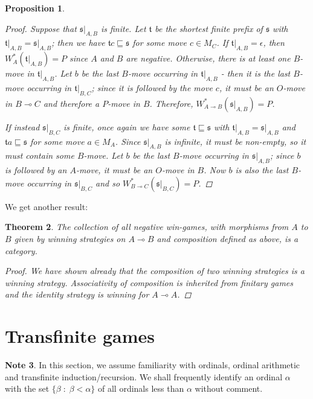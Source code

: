 \documentclass[11pt]{article} %
\theoremstyle{plain} %
\newtheorem{theorem}{Theorem}[section]
\newtheorem{proposition}[theorem]{Proposition}
\theoremstyle{definition} %
\theoremstyle{note}
\newtheorem{note}[theorem]{Note}
\theoremstyle{exercisestyle}
\renewcommand{\implies}{\multimap}
\newcommand{\suchthat}{\;\colon\;}
\newcommand{\s}{\mathfrak s}
\renewcommand{\t}{\mathfrak t}
\newcommand{\emptyplay}{\epsilon}
\newcommand{\prefix}{\sqsubseteq}
\begin{document}
\begin{proposition}
\begin{proof}
    Suppose that $\s\vert_{A,B}$ is finite.  Let $\t$ be the shortest finite prefix of $\s$ with $\t\vert_{A,B}=\s\vert_{A,B}$; then we have $\t c\prefix \s$ for some move $c\in M_C$.  If $\t\vert_{A,B}=\emptyplay$, then $W_A^*(\t\vert_{A,B})=P$ since $A$ and $B$ are negative.  Otherwise, there is at least one $B$-move in $\t\vert_{A,B}$.  Let $b$ be the last $B$-move occurring in $\t\vert_{A,B}$ - then it is the last $B$-move occurring in $\t\vert_{B,C}$; since it is followed by the move $c$, it must be an $O$-move in $B\implies C$ and therefore a $P$-move in $B$.  Therefore, $W_{A\implies B}^*(\s\vert_{A,B})=P$.  

    If instead $\s\vert_{B,C}$ is finite, once again we have some $\t\prefix\s$ with $\t\vert_{A,B}=\s\vert_{A,B}$ and $\t a\prefix\s$ for some move $a\in M_A$.  Since $\s\vert_{A,B}$ is infinite, it must be non-empty, so it must contain some $B$-move.  Let $b$ be the last $B$-move occurring in $\s\vert_{A,B}$; since $b$ is followed by an $A$-move, it must be an $O$-move in $B$.  Now $b$ is also the last $B$-move occurring in $\s\vert_{B,C}$ and so $W_{B\implies C}^*(\s\vert_{B,C})=P$.
  \end{proof}
\end{proposition}

We get another result:

\begin{theorem}
  The collection of all negative win-games, with morphisms from $A$ to $B$ given by winning strategies on $A\implies B$ and composition defined as above, is a category.
  \begin{proof}
    We have shown already that the composition of two winning strategies is a winning strategy.  Associativity of composition is inherited from finitary games and the identity strategy is winning for $A\implies A$.  
  \end{proof}
\end{theorem}

\section{Transfinite games}

\begin{note}
  In this section, we assume familiarity with ordinals, ordinal arithmetic and transfinite induction/recursion.  We shall frequently identify an ordinal $\alpha$ with the set $\{\beta\suchthat\beta<\alpha\}$ of all ordinals less than $\alpha$ without comment.
\end{note}
\end{document}
